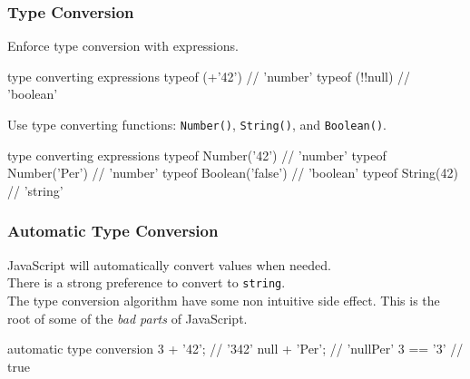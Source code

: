 \begin{frame}[fragile]
  \frametitle{Type Conversion}
  Enforce type conversion with expressions.\\
  \begin{CodeBox}{ type converting expressions}
typeof (+'42') // 'number'
typeof (!!null) // 'boolean'
  \end{CodeBox}
  \vspace{5mm}
  Use type converting functions: \verb|Number()|, \verb|String()|, and \verb|Boolean()|.
  \begin{CodeBox}{ type converting expressions}
typeof Number('42') // 'number'
typeof Number('Per') // 'number'
typeof Boolean('false') // 'boolean'
typeof String(42) // 'string'
  \end{CodeBox}
\end{frame}

\begin{frame}[fragile]
  \frametitle{Automatic Type Conversion}
  JavaScript will automatically convert values when needed.\\
  There is a strong preference to convert to \verb|string|.\\
  The type conversion algorithm have some non intuitive side effect. This is the root of some of the \emph{bad parts}
   of JavaScript.
\vspace{5mm}
  \begin{CodeBox}{ automatic type conversion}
3 + '42';      // '342'
null + 'Per'; //  'nullPer'
3 == '3'       // true
  \end{CodeBox}
\end{frame}

